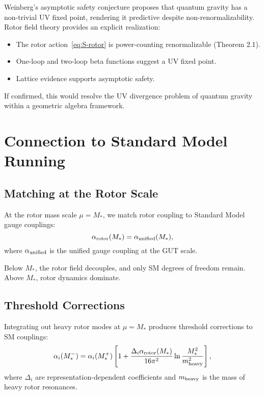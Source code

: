 \documentclass[11pt,a4paper]{article}
\numberwithin{equation}{section}
\theoremstyle{plain}
\theoremstyle{definition}
\theoremstyle{remark}
\begin{document}
Weinberg's asymptotic safety conjecture proposes that quantum gravity has a non-trivial UV fixed point, rendering it predictive despite non-renormalizability. Rotor field theory provides an explicit realization:
\begin{itemize}
  \item The rotor action~\eqref{eq:S-rotor} is power-counting renormalizable (Theorem 2.1).
  \item One-loop and two-loop beta functions suggest a UV fixed point.
  \item Lattice evidence supports asymptotic safety.
\end{itemize}

If confirmed, this would resolve the UV divergence problem of quantum gravity within a geometric algebra framework.

\vspace{1em}

\section{Connection to Standard Model Running}\label{sec:SM}

\subsection{Matching at the Rotor Scale}

At the rotor mass scale $\mu=M_*$, we match rotor coupling to Standard Model gauge couplings:
\begin{equation}
\alpha_{\rm rotor}(M_*) = \alpha_{\rm unified}(M_*),
\label{eq:matching}
\end{equation}
where $\alpha_{\rm unified}$ is the unified gauge coupling at the GUT scale.

Below $M_*$, the rotor field decouples, and only SM degrees of freedom remain. Above $M_*$, rotor dynamics dominate.

\subsection{Threshold Corrections}

Integrating out heavy rotor modes at $\mu=M_*$ produces threshold corrections to SM couplings:
\begin{equation}
\alpha_i(M_*^-) = \alpha_i(M_*^+)\left[1 + \frac{\Delta_i\alpha_{\rm rotor}(M_*)}{16\pi^2}\ln\frac{M_*^2}{m_{\rm heavy}^2}\right],
\label{eq:threshold}
\end{equation}
where $\Delta_i$ are representation-dependent coefficients and $m_{\rm heavy}$ is the mass of heavy rotor resonances.
\end{document}
